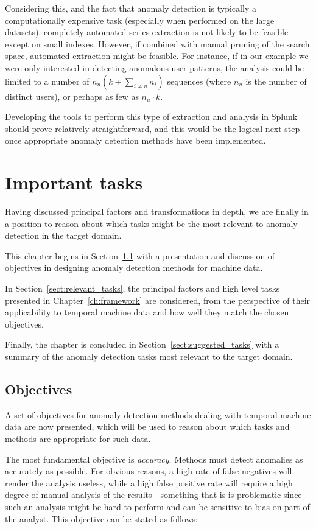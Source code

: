 Considering this, and the fact that anomaly detection is typically a computationally expensive task (especially when performed on the large datasets), completely automated series extraction is not likely to be feasible except on small indexes. However, if combined with manual pruning of the search space, automated extraction might be feasible. For instance, if in our example we were only interested in detecting anomalous user patterns, the analysis could be limited to a number of $n_u (k + \sum_{i \neq u} n_i)$ sequences (where $n_u$ is the number of distinct users), or perhaps as few as $n_u \cdot k$.

Developing the tools to perform this type of extraction and analysis in Splunk should prove relatively straightforward, and this would be the logical next step once appropriate anomaly detection methods have been implemented.

\section{Important tasks}
\label{ch:problems}

Having discussed principal factors and transformations in depth, we are finally in a position to reason about which tasks might be the most relevant to anomaly detection in the target domain.

This chapter begins in Section~\ref{sect:goals} with a presentation and discussion of objectives in designing anomaly detection methods for machine data.

In Section~\ref{sect:relevant_tasks}, the principal factors and high level tasks presented in Chapter~\ref{ch:framework} are considered, from the perspective of their applicability to temporal machine data and how well they match the chosen objectives.

Finally, the chapter is concluded in Section~\ref{sect:suggested_tasks} with a summary of the anomaly detection tasks most relevant to the target domain.

\subsection{Objectives}
\label{sect:goals}

A set of objectives for anomaly detection methods dealing with temporal machine data are now presented, which will be used to reason about which tasks and methods are appropriate for such data.

The most fundamental objective is \emph{accuracy}. Methods must detect anomalies as accurately as possible. For obvious reasons, a high rate of false negatives will render the analysis useless, while a high false positive rate will require a high degree of manual analysis of the results---something that is is problematic since such an analysis might be hard to perform and can be sensitive to bias on part of the analyst. This objective can be stated as follows:

